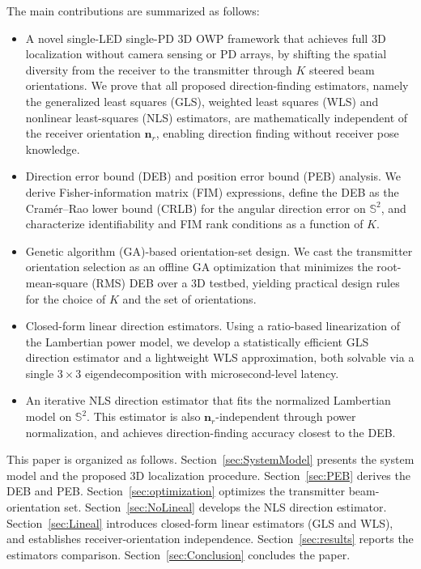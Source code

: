\documentclass[journal]{IEEEtran}
\begin{document}
The main contributions are summarized as follows:
\begin{itemize}
    \item A novel single-LED single-PD 3D OWP framework that achieves full 3D localization without camera sensing or PD arrays, by shifting the spatial diversity from the receiver to the transmitter through $K$ steered beam orientations. We prove that all proposed direction-finding estimators, namely the generalized least squares (GLS), weighted least squares (WLS) and nonlinear least-squares (NLS) estimators, are mathematically independent of the receiver orientation $\mathbf{n}_r$, enabling direction finding without receiver pose knowledge.
    \item Direction error bound (DEB) and position error bound (PEB) analysis. We derive Fisher-information matrix (FIM) expressions, define the DEB as the Cramér--Rao lower bound (CRLB) for the angular direction error on $\mathbb{S}^2$, and characterize identifiability and FIM rank conditions as a function of $K$.
    \item Genetic algorithm (GA)-based orientation-set design. We cast the transmitter orientation selection as an offline GA optimization that minimizes the root-mean-square (RMS) DEB over a 3D testbed, yielding practical design rules for the choice of $K$ and the set of orientations.
    \item Closed-form linear direction estimators. Using a ratio-based linearization of the Lambertian power model, we develop a statistically efficient GLS direction estimator and a lightweight WLS approximation, both solvable via a single $3\times3$ eigendecomposition with microsecond-level latency.
    \item An iterative NLS direction estimator that fits the normalized Lambertian model on $\mathbb{S}^2$. This estimator is also $\mathbf{n}_r$-independent through power normalization, and achieves direction-finding accuracy closest to the DEB.
\end{itemize}

This paper is organized as follows.
Section~\ref{sec:SystemModel} presents the system model and the proposed 3D localization procedure.
Section~\ref{sec:PEB} derives the DEB and PEB.
Section~\ref{sec:optimization} optimizes the transmitter beam-orientation set.
Section~\ref{sec:NoLineal} develops the NLS direction estimator.
Section~\ref{sec:Lineal} introduces closed-form linear estimators (GLS and WLS), and establishes receiver-orientation independence.
Section~\ref{sec:results} reports the estimators comparison.
Section~\ref{sec:Conclusion} concludes the paper.
\end{document}
